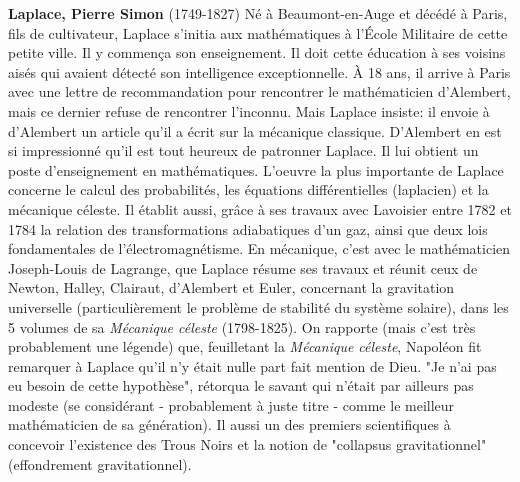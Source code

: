 \textbf{Laplace, Pierre Simon} (1749-1827) Né à Beaumont-en-Auge et décédé à Paris, fils de cultivateur, Laplace s'initia aux mathématiques à l'École Militaire de cette petite ville. Il y commença son enseignement. Il doit cette éducation à ses voisins aisés qui avaient détecté son intelligence exceptionnelle. À 18 ans, il arrive à Paris avec une lettre de recommandation pour rencontrer le mathématicien d'Alembert, mais ce dernier refuse de rencontrer l'inconnu. Mais Laplace insiste: il envoie à d'Alembert un article qu'il a écrit sur la mécanique classique. D'Alembert en est si impressionné qu'il est tout heureux de patronner Laplace. Il lui obtient un poste d'enseignement en mathématiques. L'oeuvre la plus importante de Laplace concerne le calcul des probabilités, les équations différentielles (laplacien) et la mécanique céleste. Il établit aussi, grâce à ses travaux avec Lavoisier entre 1782 et 1784 la relation des transformations adiabatiques d'un gaz, ainsi que deux lois fondamentales de l'électromagnétisme. En mécanique, c'est avec le mathématicien Joseph-Louis de Lagrange, que Laplace résume ses travaux et réunit ceux de Newton, Halley, Clairaut, d'Alembert et Euler, concernant la gravitation universelle (particulièrement le problème de stabilité du système solaire), dans les 5 volumes de sa \textit{Mécanique céleste} (1798-1825). On rapporte (mais c'est très probablement une légende) que, feuilletant la \textit{Mécanique céleste}, Napoléon fit remarquer à Laplace qu'il n'y était nulle part fait mention de Dieu. "Je n'ai pas eu besoin de cette hypothèse", rétorqua le savant qui n'était par ailleurs pas modeste (se considérant - probablement à juste titre - comme le meilleur mathématicien de sa génération). Il aussi un des premiers scientifiques à concevoir l'existence des Trous Noirs et la notion de "collapsus gravitationnel" (effondrement gravitationnel).

